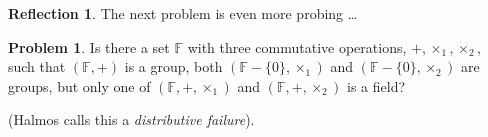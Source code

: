 \documentclass[english,notitlepage,smartquotes]{hgbreport}
\theoremstyle{definition}
\theoremstyle{definition}
\newtheorem{problem}{Problem}
\theoremstyle{remark}
\theoremstyle{definition}
\theoremstyle{plain}
\theoremstyle{definition}
\newtheorem{reflection}{Reflection}
\begin{document}
\begin{reflection}
The next problem is even more probing \dots 
\end{reflection}



\begin{problem}
Is there a set $\mathbb{F}$ with three commutative operations, $+,\times_1,\times_2$, such that $(\mathbb{F},+)$ is a group, both $(\mathbb{F}-\{0\},\times_1)$ and $(\mathbb{F}-\{0\},\times_2)$ are groups, but only one of $(\mathbb{F},+,\times_1)$ and $(\mathbb{F},+,\times_2)$ is a field?

(Halmos calls this a \emph{distributive failure}).
\end{problem}




\MakeBibliography[nosplit]

\end{document}
